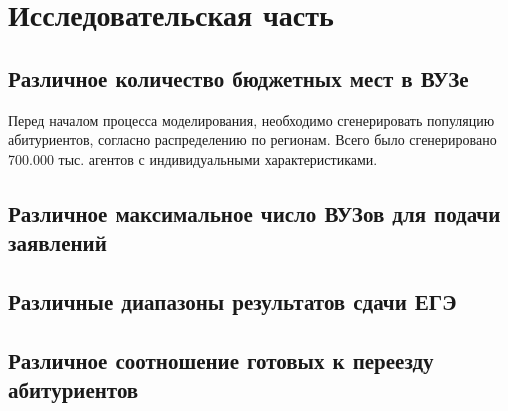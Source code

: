 \section{Исследовательская часть}

\subsection{Различное количество бюджетных мест в ВУЗе}

Перед началом процесса моделирования, необходимо сгенерировать популяцию абитуриентов, согласно распределению по регионам. Всего было сгенерировано 700.000 тыс. агентов с индивидуальными характеристиками.

\subsection{Различное максимальное число ВУЗов для подачи заявлений}

\subsection{Различные диапазоны результатов сдачи ЕГЭ}

\subsection{Различное соотношение готовых к переезду абитуриентов}

\pagebreak